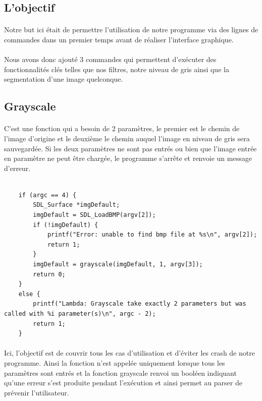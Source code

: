 \documentclass{article}
\begin{document}
\subsection{L'objectif}

\paragraph{}Notre but ici était de permettre l'utilisation de notre programme via des lignes de commandes dans un premier temps avant de réaliser l'interface graphique.

\paragraph{}Nous avons donc ajouté 3 commandes qui permettent d'exécuter des fonctionnalités clés telles que nos filtres, notre niveau de gris ainsi que la segmentation d'une image quelconque.

\subsection{Grayscale}

\paragraph{}C'est une fonction qui a besoin de 2 paramètres, le premier est le chemin de l'image d'origine et le deuxième le chemin auquel l'image en niveau de gris sera sauvegardée. Si les deux paramètres ne sont pas entrés ou bien que l'image entrée en paramètre ne peut être chargée, le programme s'arrête et renvoie un message d'erreur.

\begin{lstlisting}

	if (argc == 4) {
		SDL_Surface *imgDefault;
		imgDefault = SDL_LoadBMP(argv[2]);
		if (!imgDefault) {
			printf("Error: unable to find bmp file at %s\n", argv[2]);
			return 1;
		}
		imgDefault = grayscale(imgDefault, 1, argv[3]);
		return 0;
	}
	else {
		printf("Lambda: Grayscale take exactly 2 parameters but was called with %i parameter(s)\n", argc - 2);
		return 1;
	}
\end{lstlisting}

\paragraph{}Ici, l'objectif est de couvrir tous les cas d'utilisation et d'éviter les crash de notre programme. Ainsi la fonction n'est appelée uniquement lorsque tous les paramètres sont entrés et la fonction grayscale renvoi un booléen indiquant qu'une erreur s'est produite pendant l'exécution et ainsi permet au parser de prévenir l'utilisateur.
\end{document}
